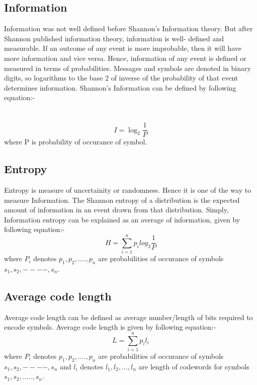 \documentclass[10pt,a4paper]{article}
\begin{document}
\subsection*{Information}
Information was not well defined  before Shannon's Information theory. But after Shannon published information theory, information is well- defined and measurable. If an outcome of any event is more improbable, then it will have more information and vice versa. Hence, information of any event is defined or measured in terms of probabilities. Messages and symbols are denoted in binary digits, so logarithms to the base 2 of inverse of the probability of that event determines information. Shannon's Information can be defined by following equation:- \\
\\
\\
\begin{equation}
 I = \log _{2} {\frac{1}{P}}
\end{equation}
where P is probability of occurance of symbol.
\subsection*{Entropy}
Entropy is measure of uncertainity or randomness. Hence it is one of the way to measure Information. The Shannon entropy of a distribution is the expected amount of information in an event drawn from that distribution. Simply,  Information entropy can be explained as an average of information, given by following equation:- \\
\begin{equation}
 H = \sum_{i=1}^{n} p_i log_{2}{\frac{1}{P}}
\end{equation}
where $P_i$ denotes $p_1, p_2,...., p_n$ are probabilities of occurance of symbols $s_1, s_2, ----,s_ n . $
\subsection*{Average code length}
Average code length can be defined as average number/length of  bits required to encode symbols. Average code length is given by following equation:- 
\begin{equation}
L = \sum_{i=1}^{n} p_i l_i 
\end{equation}
where $ P_i $ denotes $ p_1, p_2,...., p_n$ are probabilities of occurance of symbols $s_1, s_2, ----, s_n$ and $l_i$ denotes $ l_1, l_2 , ..., l_n$ are length of codewords for symbols $s_1, s_2, ....., s_n. $ \\
\end{document}
